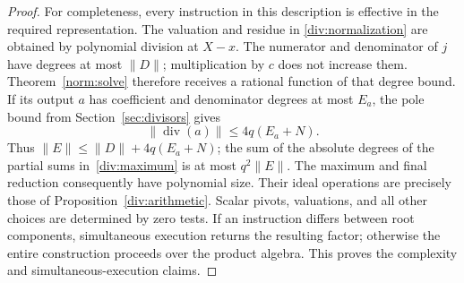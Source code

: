 \begin{proof}
For completeness, every instruction in this description is effective in
the required representation.  The valuation and residue in
\eqref{div:normalization} are obtained by polynomial division at $X-x$.
The numerator and denominator of $j$ have degrees at most $\|D\|$;
multiplication by $c$ does not increase them.  Theorem~\ref{norm:solve}
therefore receives a rational function of that degree bound.  If its
output $a$ has coefficient and denominator degrees at most $E_a$, the
pole bound from Section~\ref{sec:divisors} gives
\[
 \|\operatorname{div}(a)\|\leq 4q(E_a+N).
\]
Thus $\|E\|\leq\|D\|+4q(E_a+N)$; the sum of the absolute degrees of
the partial sums in~\eqref{div:maximum} is at most $q^2\|E\|$.
The maximum and final reduction consequently have polynomial size.
Their ideal operations are precisely those of
Proposition~\ref{div:arithmetic}.  Scalar pivots, valuations, and all
other choices are determined by zero tests.  If an instruction differs
between root components, simultaneous execution returns the resulting
factor; otherwise the entire construction proceeds over the product
algebra.  This proves the complexity and simultaneous-execution claims.
\end{proof}
